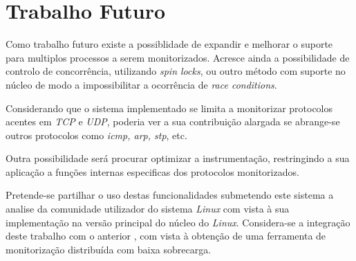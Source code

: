 \section{Trabalho Futuro}

Como trabalho futuro existe a possiblidade de expandir e melhorar o suporte para multiplos processos a serem monitorizados.
Acresce ainda a possibilidade de controlo de concorrência, utilizando \textit{spin locks}, ou outro método com suporte no núcleo de modo a impossibilitar a ocorrência de \textit{race conditions}.

Considerando que o sistema implementado se limita a monitorizar protocolos acentes em \textit{TCP} e \textit{UDP}, poderia ver a sua contribuição alargada se abrange-se outros protocolos como \textit{icmp, arp, stp}, etc.

Outra possibilidade será procurar optimizar a instrumentação, restringindo a sua aplicação a funções internas especificas dos protocolos monitorizados.

Pretende-se partilhar o uso destas funcionalidades submetendo este sistema a analise da comunidade utilizador do sistema \textit{Linux} com vista à sua implementação na versão principal do núcleo do \textit{Linux}.
Considera-se a integração deste trabalho com o anterior \cite{duarte10,Farruca:2009}, com vista à obtenção de uma ferramenta de monitorização distribuída com baixa sobrecarga.
